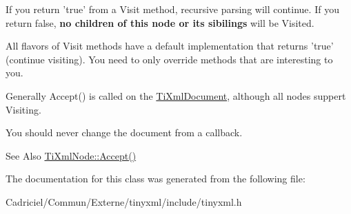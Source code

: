 If you return 'true' from a Visit method, recursive parsing will continue. If you return false, {\bfseries no children of this node or its sibilings} will be Visited.

All flavors of Visit methods have a default implementation that returns 'true' (continue visiting). You need to only override methods that are interesting to you.

Generally Accept() is called on the \hyperlink{class_ti_xml_document}{Ti\-Xml\-Document}, although all nodes suppert Visiting.

You should never change the document from a callback.

\begin{DoxySeeAlso}{See Also}
\hyperlink{class_ti_xml_node_acc0f88b7462c6cb73809d410a4f5bb86}{Ti\-Xml\-Node\-::\-Accept()} 
\end{DoxySeeAlso}


The documentation for this class was generated from the following file\-:\begin{DoxyCompactItemize}
\item 
Cadriciel/\-Commun/\-Externe/tinyxml/include/tinyxml.\-h\end{DoxyCompactItemize}
